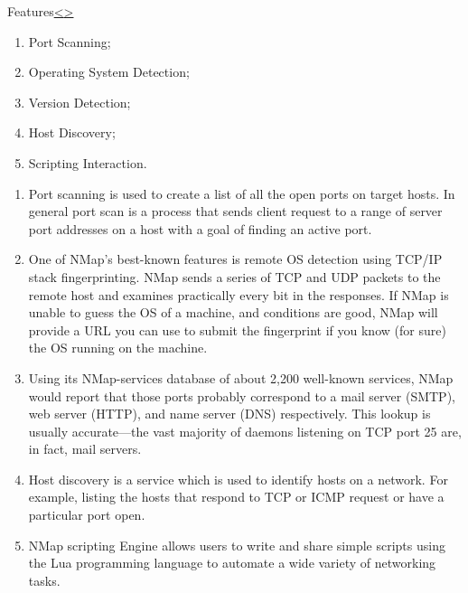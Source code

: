 \documentclass[12pt]{article}
\newenvironment{instructionblock}{\Large\bgroup}{\egroup}
\begin{document}
\pagebreak
\begin{slide}{Features}{\hyperref[slide 1]{\textless}\hyperref[slide 3]{\textgreater}}
   \begin{instructionblock}
      \begin{enumerate}
         \item Port Scanning; 
         \item Operating System Detection;
         \item Version Detection;
         \item Host Discovery;
         \item Scripting Interaction.
      \end{enumerate}
   \end{instructionblock}
\end{slide}
\begin{enumerate}
   \item 

Port scanning is used to create a list of all the open ports on target hosts. In general port scan is a process that sends client request to a range of server port addresses on a host with a goal of finding an active port.

\item One of NMap's best-known features is remote OS detection using TCP/IP stack fingerprinting. NMap sends a series of TCP and UDP packets to the remote host and examines practically every bit in the responses. If NMap is unable to guess the OS of a machine, and conditions are good,  NMap will provide a URL you can use to submit the fingerprint if you know (for sure) the OS running on the machine. 
\cite{book} 

\item Using its NMap-services database of about 2,200 well-known services,  NMap would report that those ports probably correspond to a mail server (SMTP), web server (HTTP), and name server (DNS) respectively. This lookup is usually accurate—the vast majority of daemons listening on TCP port 25 are, in fact, mail servers.

\item Host discovery is a service which is used to identify hosts on a network. For example, listing the hosts that respond to TCP or ICMP request or have a particular port open.

\item NMap scripting Engine allows users to write and share simple scripts using the Lua programming language  to automate a wide variety of networking tasks.
\cite{book} 
\end{enumerate}
\end{document}
